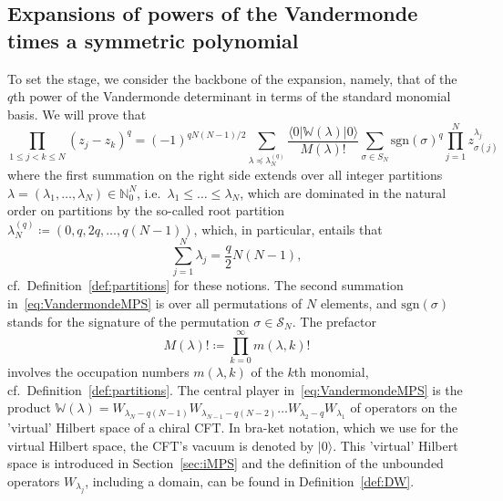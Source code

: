 \documentclass[letterpaper, DIV=17]{scrartcl}
\numberwithin{equation}{section}
\theoremstyle{definition}
\begin{document}
\subsection{Expansions of powers of the Vandermonde times a symmetric polynomial} 
%
To set the stage, we consider the backbone of the expansion, namely, that of the $q$th power of the Vandermonde determinant in terms of the standard monomial basis. We will prove that 
\begin{equation}\label{eq:VandermondeMPS}
 \prod_{1\leq j< k \leq N} (z_j-z_k)^q  =(-1)^{qN(N-1)/2}  \!\!  \sum_{\lambda \preceq \lambda^{(q)}_N}   \frac{ \langle 0 \vert \mathbb{W}(\lambda) \vert 0 \rangle }{ M(\lambda)!}  \sum_{\sigma\in S_N} \mathrm{sgn}(\sigma)^q   \prod_{j=1}^N z_{\sigma(j)}^{\lambda_j}
\end{equation}
where the first summation on the right side extends over all integer partitions $ \lambda = (\lambda_1, \dots , \lambda_N) \in \mathbb{N}_0^N $, i.e.\ 
$ \lambda_1 \leq \dots \leq \lambda_N $,
which are dominated in the natural order on partitions by the so-called root partition
$
\lambda^{(q)}_N \coloneqq (0, q , 2q, \dots , q (N-1) ) 
$, which, in particular, entails that
$$
 \sum_{j=1}^N \lambda_j = \frac{q}{2} N(N-1) ,
$$
cf.\ Definition~\ref{def:partitions} for these notions. The second summation in~\eqref{eq:VandermondeMPS} is over all permutations of $ N $ elements, and $\mathrm{sgn}(\sigma) $ stands for the signature of the permutation $ \sigma \in \mathcal{S}_N $. The prefactor 
 $$ M(\lambda)! \coloneqq \prod_{k=0}^\infty m(\lambda, k)! $$ involves the occupation numbers $ m(\lambda, k) $ of the $k$th monomial, cf.\ Definition~\ref{def:partitions}. 
The central player in~\eqref{eq:VandermondeMPS} is the product
$\mathbb{W}(\lambda) =  W_{\lambda_N-q(N-1)} W_{\lambda_{N-1}-q(N-2)} \dots W_{\lambda_2 - q} W_{\lambda_1}  $
of operators on the 'virtual' Hilbert space of a chiral CFT.  In bra-ket notation, which we use for the virtual Hilbert space,  the CFT's vacuum is denoted by $ | 0 \rangle $. This 'virtual' Hilbert space is introduced in Section~\ref{sec:iMPS} and the definition of the unbounded operators $ W_{\lambda_j}$, including a domain, can be found in Definition~\ref{def:DW}. \\
\end{document}
